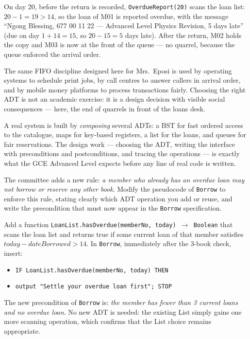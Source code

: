 \documentclass[11pt]{article}
\newcommand{\cle}[1]{{\popxbold\color{popdark}#1}}
\begin{document}
On day 20, before the return is recorded, \texttt{OverdueReport(20)} scans the loan list: $20 - 1 = 19 > 14$, so the loan of M01 is reported overdue, with the message ``Ngong Blessing, 677 00 11 22 — Advanced Level Physics Revision, 5 days late'' (due on day $1 + 14 = 15$, so $20 - 15 = 5$ days late). After the return, M02 holds the copy and M03 is now at the front of the queue — no quarrel, because the queue enforced the arrival order.

\begin{savaistu}
The same FIFO discipline designed here for Mrs.\ Eposi is used by operating systems to schedule print jobs, by call centres to answer callers in arrival order, and by mobile money platforms to process transactions fairly. Choosing the right ADT is not an academic exercise: it is a design decision with visible social consequences — here, the end of quarrels in front of the loans desk.
\end{savaistu}

\begin{aretenir}
A real system is built by \emph{composing} several ADTs: a \cle{BST} for fast ordered access to the catalogue, \cle{maps} for key-based registers, a \cle{list} for the loans, and \cle{queues} for fair reservations. The design work — choosing the ADT, writing the interface with preconditions and postconditions, and tracing the operations — is exactly what the GCE Advanced Level expects before any line of real code is written.
\end{aretenir}

\begin{exercice}
The committee adds a new rule: \emph{a member who already has an overdue loan may not borrow or reserve any other book}. Modify the pseudocode of \texttt{Borrow} to enforce this rule, stating clearly which ADT operation you add or reuse, and write the precondition that must now appear in the \texttt{Borrow} specification.
\end{exercice}

\begin{corrige}
Add a function \texttt{LoanList.hasOverdue(memberNo, today) $\rightarrow$ Boolean} that scans the loan list and returns true if some current loan of that member satisfies $today - dateBorrowed > 14$. In \texttt{Borrow}, immediately after the 3-book check, insert:
\begin{itemize}
\item[] \texttt{\quad IF LoanList.hasOverdue(memberNo, today) THEN}
\item[] \texttt{\quad\quad output "Settle your overdue loan first"; STOP}
\end{itemize}
The new precondition of \texttt{Borrow} is: \emph{the member has fewer than 3 current loans and no overdue loan}. No new ADT is needed: the existing List simply gains one more scanning operation, which confirms that the List choice remains appropriate.
\end{corrige}
\end{document}
